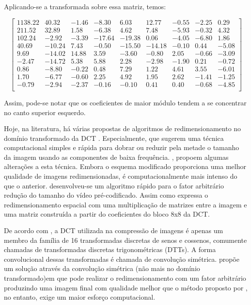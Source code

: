\noindent Aplicando-se a transformada sobre essa matriz, temos:


\begin{center}
	\begin{equation}
\begin{bmatrix}
1138.22&	40.32&	-1.46&	-8.30&	6.03&	12.77&	-0.55&	-2.25&	0.29\\
211.52&	32.89&	1.58&	-6.38&	4.62&	7.48&	-5.93&	-0.32&	4.32\\
102.24&	-2.92&	-3.39&	-17.64&	-19.38&	0.06&	-4.05&	-6.80&	1.86\\	
40.69&	-10.24&	7.43&	-0.50&	-15.50&	-14.18&	-0.10&	0.44&	-5.08\\	
9.69&	-14.02&	14.88&	3.59&	-3.60&	-0.80&	2.05&	-0.66&	-3.09\\
-2.47&	-14.72&	5.38&	5.88&	2.28&	-2.98&	-1.90&	0.21&	-0.72\\
0.86&	-8.80&	-0.22&	0.48&	7.29&	1.22&	4.61&	3.55&	-6.01\\
1.70&	-6.77&	-0.60&	2.25&	4.92&	1.95&	2.62&	-1.41&	-1.25\\
-0.79&	-2.94&	-2.37&	-0.16&	-0.10&	0.41&	0.40&	-0.68&	-4.85\\
\end{bmatrix}	
	\end{equation}
\end{center}

\noindent Assim, pode-se notar que os coeficientes de maior módulo tendem a se concentrar no canto superior esquerdo. 

Hoje, na literatura, há várias propostas de algoritmos de redimensionamento no domínio transformado da DCT \cite{patil2006fast2,chang1995manipulation,wang2010adaptive}. Especialmente, \cite{dugad2001fast} que sugerem uma técnica computacional simples e rápida para dobrar ou reduzir pela metade o tamanho da imagem usando as componentes de baixa frequência. \cite{mukherjee2002image}, propoem algumas alterações a esta técnica. Embora o esquema modificado proporciona uma melhor qualidade de imagens redimensionadas, é computacionalmente mais intenso do que o anterior. \cite{patil2006fast2} desenvolveu-se um algoritmo rápido para o fator arbitrário redução do tamanho do vídeo pré-codificado. Assim como expressa o redimensionamento espacial com uma multiplicação de matrizes entre a imagem e uma matriz construída a partir do coeficientes do bloco 8x8 da DCT.

De acordo com \cite{martucci1995image}, a DCT utilizada na compressão de imagens é apenas um membro da família de 16 transformadas discretas de senos e cossenos, comumente chamadas de transformadas discretas trigonométricas (DTTs). A forma convolucional dessas transformadas é chamada de convolução simétrica. \cite{park2003m} propõe um solução através da convolução simétrica (não mais no domínio transformado)em que pode realizar o redimensionamento com um fator arbitrário produzindo uma imagem final com qualidade melhor que o método proposto por \cite{dugad2001fast}, no entanto, exige um maior esforço computacional.

